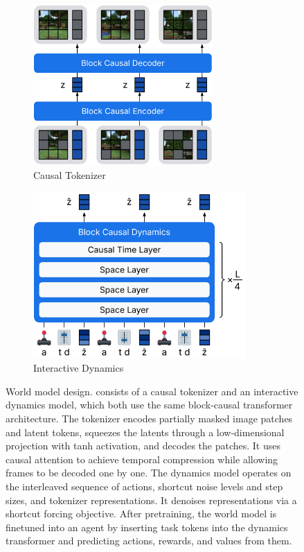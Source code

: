 \begin{figure}[t!]
\vspace*{-2\baselineskip}
\centering
\begin{subfigure}[t]{0.45\textwidth}
\centering
\includegraphics[height=2.4in]{figures/method/tok}
\caption{Causal Tokenizer}
\end{subfigure}%
\hfill%
\begin{subfigure}[t]{0.45\textwidth}
\centering
\includegraphics[height=2.5in]{figures/method/dyn}
\caption{Interactive Dynamics}
\end{subfigure}
\caption{World model design.
\method consists of a causal tokenizer and an interactive dynamics model, which both use the same block-causal transformer architecture.
The tokenizer encodes partially masked image patches and latent tokens, squeezes the latents through a low-dimensional projection with tanh activation, and decodes the patches.
It uses causal attention to achieve temporal compression while allowing frames to be decoded one by one.
The dynamics model operates on the interleaved sequence of actions, shortcut noise levels and step sizes, and tokenizer representations.
It denoises representations via a shortcut forcing objective.
After pretraining, the world model is finetuned into an agent by inserting task tokens into the dynamics transformer and predicting actions, rewards, and values from them.
}
\label{fig:model}
\end{figure}
